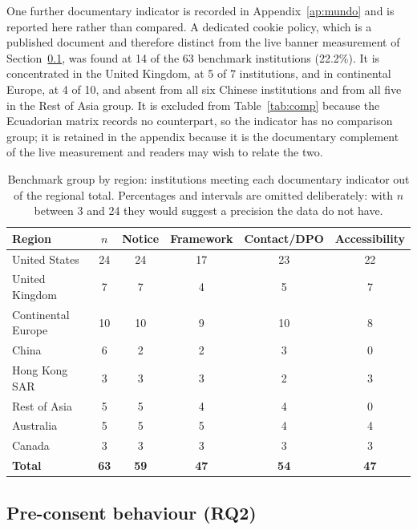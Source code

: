 \documentclass[]{interact}
\begin{document}
One further documentary indicator is recorded in Appendix~\ref{ap:mundo} and is reported here rather than compared. A dedicated cookie policy, which is a published document and therefore distinct from the live banner measurement of Section~\ref{sec:results-cookies}, was found at 14 of the 63 benchmark institutions (22.2\%). It is concentrated in the United Kingdom, at 5 of 7 institutions, and in continental Europe, at 4 of 10, and absent from all six Chinese institutions and from all five in the Rest of Asia group. It is excluded from Table~\ref{tab:comp} because the Ecuadorian matrix records no counterpart, so the indicator has no comparison group; it is retained in the appendix because it is the documentary complement of the live measurement and readers may wish to relate the two.

\begin{table}[htbp]
	\centering
	\caption{Benchmark group by region: institutions meeting each documentary indicator out of the regional total. Percentages and intervals are omitted deliberately: with $n$ between 3 and 24 they would suggest a precision the data do not have.}\label{tab:reg}
	\small
	\begin{tabular}{@{}lccccc@{}}
		\toprule
		\textbf{Region} & \textbf{$n$} & \textbf{Notice} & \textbf{Framework} & \textbf{Contact/DPO} & \textbf{Accessibility} \\
		\midrule
		United States & 24 & 24 & 17 & 23 & 22 \\
		United Kingdom & 7 & 7 & 4 & 5 & 7 \\
		Continental Europe & 10 & 10 & 9 & 10 & 8 \\
		China & 6 & 2 & 2 & 3 & 0 \\
		Hong Kong SAR & 3 & 3 & 3 & 2 & 3 \\
		Rest of Asia & 5 & 5 & 4 & 4 & 0 \\
		Australia & 5 & 5 & 5 & 4 & 4 \\
		Canada & 3 & 3 & 3 & 3 & 3 \\
		\midrule
		\textbf{Total} & \textbf{63} & \textbf{59} & \textbf{47} & \textbf{54} & \textbf{47} \\
		\bottomrule
	\end{tabular}
\end{table}

\subsection{Pre-consent behaviour (RQ2)}\label{sec:results-cookies}
\end{document}
